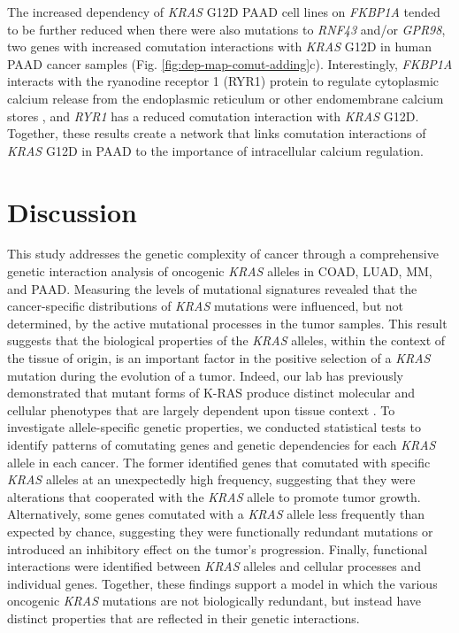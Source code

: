 \documentclass[english, 10pt, letterpaper]{article}
\newcommand{\KRAS}{\emph{KRAS}}
\newcommand{\kras}{K-RAS}
\begin{document}
The increased dependency of \KRAS{} G12D PAAD cell lines on \emph{FKBP1A} tended to be further reduced when there were also mutations to \emph{RNF43} and/or \emph{GPR98}, two genes with increased comutation interactions with \KRAS{} G12D in human PAAD cancer samples (Fig. \ref{fig:dep-map-comut-adding}c).
Interestingly, \emph{FKBP1A} interacts with the ryanodine receptor 1 (RYR1) protein to regulate cytoplasmic calcium release from the endoplasmic reticulum or other endomembrane calcium stores \cite{Jayaraman1992FK506Receptor, Fill2002RyanodineChannels.}, and \emph{RYR1} has a reduced comutation interaction with \KRAS{} G12D.
Together, these results create a network that links comutation interactions of \KRAS{} G12D in PAAD to the importance of intracellular calcium regulation.


\section*{Discussion}

This study addresses the genetic complexity of cancer through a comprehensive genetic interaction analysis of oncogenic \KRAS{} alleles in COAD, LUAD, MM, and PAAD. 
Measuring the levels of mutational signatures revealed that the cancer-specific distributions of \KRAS{} mutations were influenced, but not determined, by the active mutational processes in the tumor samples.
This result suggests that the biological properties of the \KRAS{} alleles, within the context of the tissue of origin, is an important factor in the positive selection of a \KRAS{} mutation during the evolution of a tumor.
Indeed, our lab has previously demonstrated that mutant forms of \kras{} produce distinct molecular and cellular phenotypes that are largely dependent upon tissue context \cite{Poulin2019, Brubaker2019, Johnson2019}. 
To investigate allele-specific genetic properties, we conducted statistical tests to identify patterns of comutating genes and genetic dependencies for each \KRAS{} allele in each cancer.
The former identified genes that comutated with specific \KRAS{} alleles at an unexpectedly high frequency, suggesting that they were alterations that cooperated with the \KRAS{} allele to promote tumor growth.
Alternatively, some genes comutated with a \KRAS{} allele less frequently than expected by chance, suggesting they were functionally redundant mutations or introduced an inhibitory effect on the tumor's progression.
Finally, functional interactions were identified between \KRAS{} alleles and cellular processes and individual genes.
Together, these findings support a model in which the various oncogenic \KRAS{} mutations are not biologically redundant, but instead have distinct properties that are reflected in their genetic interactions.
\end{document}
